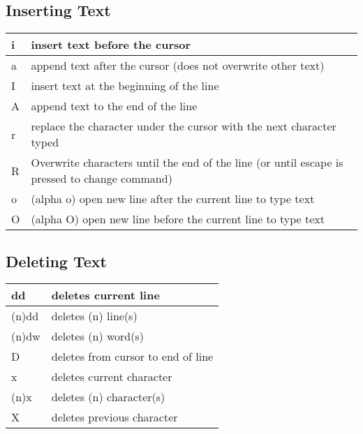 \documentclass[letterpaper,10pt,english]{sphinxmanual}
\begin{document}
\subsection{Inserting Text}
\label{editor/vi:inserting-text}
\begin{tabulary}{\linewidth}{|L|L|}
\hline

i
 & 
insert text before the cursor
\\
\hline
a
 & 
append text after the cursor (does not overwrite other text)
\\
\hline
I
 & 
insert text at the beginning of the line
\\
\hline
A
 & 
append text to the end of the line
\\
\hline
r
 & 
replace the character under the cursor with the next character typed
\\
\hline
R
 & 
Overwrite characters until the end of the line (or until escape is pressed to change command)
\\
\hline
o
 & 
(alpha o) open new line after the current line to type text
\\
\hline
O
 & 
(alpha O) open new line before the current line to type text
\\
\hline\end{tabulary}



\subsection{Deleting Text}
\label{editor/vi:deleting-text}
\begin{tabulary}{\linewidth}{|L|L|}
\hline

dd
 & 
deletes current line
\\
\hline
(n)dd
 & 
deletes (n) line(s)
\\
\hline
(n)dw
 & 
deletes (n) word(s)
\\
\hline
D
 & 
deletes from cursor to end of line
\\
\hline
x
 & 
deletes current character
\\
\hline
(n)x
 & 
deletes (n) character(s)
\\
\hline
X
 & 
deletes previous character
\\
\hline\end{tabulary}
\end{document}
